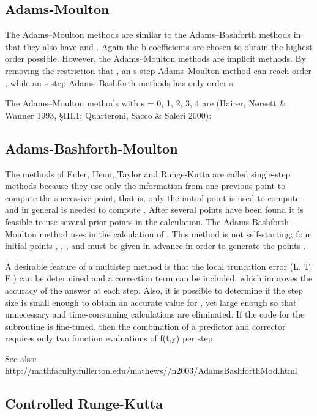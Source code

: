 \subsection{Adams-Moulton}
\label{Adams-Moulton}

The Adams–Moulton methods are similar to the Adams–Bashforth methods in that they also have  and . Again the b coefficients are chosen to obtain the highest order possible. However, the Adams–Moulton methods are implicit methods. By removing the restriction that , an s-step Adams–Moulton method can reach order , while an s-step Adams–Bashforth methods has only order s.

The Adams–Moulton methods with s = 0, 1, 2, 3, 4 are (Hairer, Nørsett \& Wanner 1993, §III.1; Quarteroni, Sacco \& Saleri 2000):




\subsection{Adams-Bashforth-Moulton}
\label{Adams-Bashforth-Moulton}

The methods of Euler, Heun, Taylor and Runge-Kutta are called single-step methods because they use only the information from one previous point to compute the successive point, that is, only the initial point    is used to compute    and in general    is needed to compute  .  After several points have been found it is feasible to use several prior points in the calculation.  The Adams-Bashforth-Moulton method uses   in the calculation of .  This method is not self-starting;  four initial points  , , ,  and  must be given in advance in order to generate the points .  

A desirable feature of a multistep method is that the local truncation error (L. T. E.) can be determined and a correction term can be included, which improves the accuracy of the answer at each step.  Also, it is possible to determine if the step size is small enough to obtain an accurate value for  , yet large enough so that unnecessary and time-consuming calculations are eliminated.  If the code for the subroutine is fine-tuned, then the combination of a  predictor and corrector requires only two function evaluations of  f(t,y)  per step. 

See also: http://mathfaculty.fullerton.edu/mathews//n2003/AdamsBashforthMod.html


\subsection{Controlled Runge-Kutta}
\label{Controlled Runge-Kutta}

